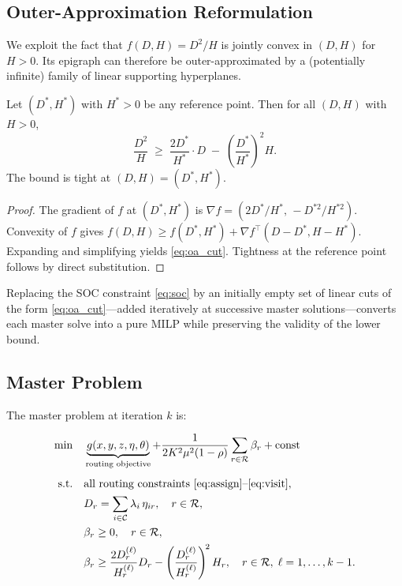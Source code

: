 \subsection{Outer-Approximation Reformulation}

We exploit the fact that $f(D,H) = D^{2}/H$ is jointly convex in
$(D,H)$ for $H > 0$.  Its epigraph can therefore be outer-approximated
by a (potentially infinite) family of linear supporting hyperplanes.

\begin{proposition}
\label{prop:oa}
Let $(D^{*},H^{*})$ with $H^{*}>0$ be any reference point.  Then for
all $(D,H)$ with $H>0$,
\begin{equation}
  \frac{D^{2}}{H}
  \;\geq\;
  \frac{2D^{*}}{H^{*}} \cdot D
  \;-\;
  \left(\frac{D^{*}}{H^{*}}\right)^{\!2} H.
  \label{eq:oa_cut}
\end{equation}
The bound is tight at $(D,H)=(D^{*},H^{*})$.
\end{proposition}

\begin{proof}
The gradient of $f$ at $(D^{*},H^{*})$ is
$\nabla f = (2D^{*}/H^{*},\,-D^{*2}/H^{*2})$.
Convexity of $f$ gives $f(D,H) \geq f(D^{*},H^{*}) + \nabla
f^{\top}(D-D^{*},H-H^{*})$.  Expanding and simplifying yields
\eqref{eq:oa_cut}. Tightness at the reference point follows by direct
substitution.
\end{proof}

Replacing the SOC constraint \eqref{eq:soc} by an initially empty
set of linear cuts of the form \eqref{eq:oa_cut}—added iteratively at
successive master solutions—converts each master solve into a pure
MILP while preserving the validity of the lower bound.

\subsection{Master Problem}

The master problem at iteration $k$ is:

\begin{subequations}
\label{eq:master}
\begin{align}
  \min \quad
  & \underbrace{g(x,y,z,\eta,\theta)}_{\text{routing objective}}
    + \frac{1}{2K^{2}\mu^{2}(1-\rho)}
      \sum_{r\in\mathcal{R}} \beta_r
    + \text{const}
  \label{eq:master_obj}\\[4pt]
  \text{s.t.} \quad
  & \text{all routing constraints \eqref{eq:assign}--\eqref{eq:visit}},
  \label{eq:master_routing}\\
  & D_r = \sum_{i\in\mathcal{C}} \lambda_i \,\eta_{ir},
    \quad r\in\mathcal{R},
  \label{eq:master_D}\\
  & \beta_r \geq 0,
    \quad r\in\mathcal{R},
  \label{eq:master_beta_lb}\\
  & \beta_r \geq
      \frac{2D_r^{(\ell)}}{H_r^{(\ell)}} D_r
      - \left(\frac{D_r^{(\ell)}}{H_r^{(\ell)}}\right)^{\!2} H_r,
    \quad r\in\mathcal{R},\;\ell=1,\dots,k-1.
  \label{eq:master_cuts}
\end{align}
\end{subequations}

